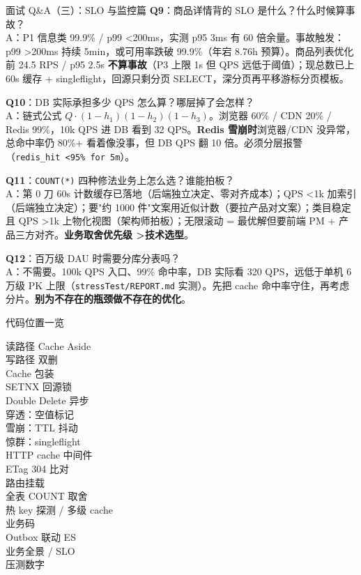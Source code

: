 \documentclass[aspectratio=169,11pt]{beamer}
\begin{document}
\begin{frame}[shrink]{面试 Q\&A（三）：SLO 与监控篇}
\small
\textbf{Q9}：商品详情背的 SLO 是什么？什么时候算事故？\\
A：P1 信息类 99.9\% / p99 \textless 200ms，实测 p95 3ms 有 60 倍余量。事故触发：p99 \textgreater 200ms 持续 5min，或可用率跌破 99.9\%（年宕 8.76h 预算）。商品列表优化前 24.5 RPS / p95 2.5s \textbf{不算事故}（P3 上限 1s 但 QPS 远低于阈值）；现总数已上 60s 缓存 + singleflight，回源只剩分页 SELECT，深分页再平移游标分页模板。

\vspace{1mm}
\textbf{Q10}：DB 实际承担多少 QPS 怎么算？哪层掉了会怎样？\\
A：链式公式 $Q \cdot (1-h_1)(1-h_2)(1-h_3)$。浏览器 60\% / CDN 20\% / Redis 99\%，10k QPS 进 DB 看到 32 QPS。\textbf{Redis 雪崩时}浏览器/CDN 没异常，总命中率仍 80\%+ 看着像没事，但 DB QPS 翻 10 倍。必须分层报警（\texttt{redis\_hit \textless 95\% for 5m}）。

\vspace{1mm}
\textbf{Q11}：\texttt{COUNT(*)} 四种修法业务上怎么选？谁能拍板？\\
A：第 0 刀 60s 计数缓存已落地（后端独立决定、零对齐成本）；QPS \textless 1k 加索引（后端独立决定）；要"约 1000 件"文案用近似计数（要拉产品对文案）；类目稳定且 QPS \textgreater 1k 上物化视图（架构师拍板）；无限滚动 = 最优解但要前端 PM + 产品三方对齐。\textbf{业务取舍优先级 \textgreater 技术选型}。

\vspace{1mm}
\textbf{Q12}：百万级 DAU 时需要分库分表吗？\\
A：不需要。100k QPS 入口、99\% 命中率，DB 实际看 320 QPS，远低于单机 6 万级 PK 上限（\texttt{stressTest/REPORT.md} 实测）。先把 cache 命中率守住，再考虑分片。\textbf{别为不存在的瓶颈做不存在的优化}。
\end{frame}

\begin{frame}[shrink]{代码位置一览}
\scriptsize
\begin{description}
  \item[读路径 Cache Aside]
  \item[写路径 双删]
  \item[Cache 包装]
  \item[SETNX 回源锁]
  \item[Double Delete 异步]
  \item[穿透：空值标记]
  \item[雪崩：TTL 抖动]
  \item[惊群：singleflight]
  \item[HTTP cache 中间件]
  \item[ETag 304 比对]
  \item[路由挂载]
  \item[全表 COUNT 取舍]
  \item[热 key 探测 / 多级 cache]
  \item[业务码]
  \item[Outbox 联动 ES]
  \item[业务全景 / SLO]
  \item[压测数字]
\end{description}
\end{frame}
\end{document}
